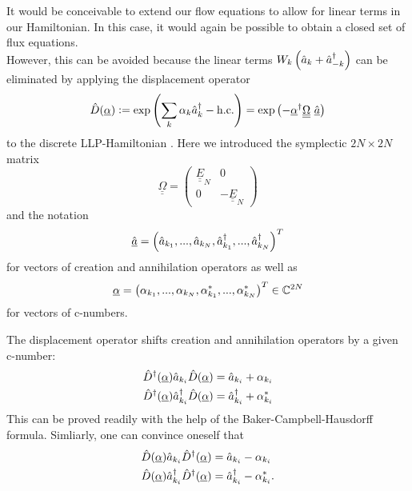 It would be conceivable to extend our flow equations to allow for linear terms in our Hamiltonian. In this case, it would again be possible to obtain a closed set of flux equations. \\
However, this can be avoided because the linear terms  $W_k \left(\hat a_{ k}+\hat a^\dagger_{- k}\right)$ can be eliminated by applying the displacement operator 
\begin{equation}
\hat D(\underline\alpha)\defeq\exp\left(\sum_k\alpha_k\CR_k-\mathrm{h.c.}\right)=\exp\left(-\underline\alpha^\dagger{\underline{\underline\Omega}}\ \underline{\hat a}\right)
\end{equation}
to the discrete LLP-Hamiltonian \cite{PracticalTraining}. Here we introduced the symplectic $2N\times2N$ matrix
\begin{equation}\label{symplectic_matrix}
{\underline{\underline\Omega}}=\begin{pmatrix}\underline{\underline E}_N & 0\\ 0 & -\underline{\underline E}_N\end{pmatrix}
\end{equation}
and the notation
\begin{equation}\label{cr_an_vector}
\underline{\hat a} = \left(\hat a_{k_1},...,\hat a_{k_N},\hat a^\dagger_{k_1},...,\hat a^\dagger_{k_N}\right)^T
\end{equation}
for vectors of creation and annihilation operators as well as
\begin{equation}\label{c-number_vector}
\underline\alpha = \left(\alpha_{k_1},...,\alpha_{k_N},\alpha_{k_1}^*,...,\alpha_{k_N}^*\right)^T\in\mathbb{C}^{2N}
\end{equation}
for vectors of c-numbers. \par %
The displacement operator shifts creation and annihilation operators by a given c-number:
\begin{subequations}
\begin{align}
\hat D^\dagger(\underline \alpha)\hat a_{k_i}\hat D(\underline\alpha)&=\hat a_{k_i}+\alpha_{k_i}\\
\hat D^\dagger(\underline \alpha)\hat a^\dagger_{k_i}\hat D(\underline\alpha)&=\hat a^\dagger_{k_i}+\alpha_{k_i}^*
\end{align}
\end{subequations}
This can be proved readily with the help of the Baker-Campbell-Hausdorff formula.
Simliarly, one can convince oneself that
\begin{subequations}
\begin{align}
\hat D(\underline \alpha)\hat a_{k_i}\hat D^\dagger(\underline\alpha)&=\hat a_{k_i}-\alpha_{k_i}\\
\hat D(\underline \alpha)\hat a^\dagger_{k_i}\hat D^\dagger(\underline\alpha)&=\hat a^\dagger_{k_i}-\alpha_{k_i}^*.
\end{align}
\end{subequations}

